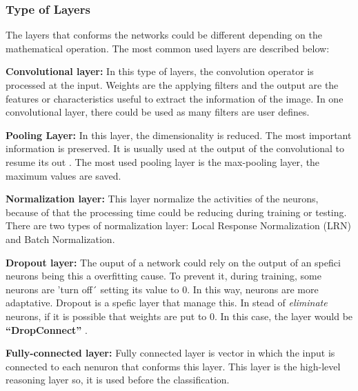 \subsubsection{Type of Layers}
The layers that conforms the networks could be different depending on the mathematical operation. The most common used layers are described below:
\begin{description}[noitemsep,topsep=8pt,parsep=0pt,partopsep=20pt]
	\item \textbf{Convolutional layer:} In this type of layers, the convolution operator is processed at the input. Weights are the applying filters and the output are the features or characteristics useful to extract the information of the image. In one convolutional layer, there could be used as many filters are user defines.
	\item \textbf{Pooling Layer:} In this layer, the dimensionality is reduced. The most important information is preserved. It is usually used at the output of the convolutional to resume its out \cite{Doorn}. The most used pooling layer is the max-pooling layer, the maximum values are saved.
	\item \textbf{Normalization layer:} This layer normalize the activities of the neurons, because of that the processing time could be reducing during training or testing. There are two types of normalization layer: Local Response Normalization (LRN) and Batch Normalization.
	\item \textbf{Dropout layer:} The ouput of a network could rely on the output of an spefici neurons being this a overfitting cause. To prevent it, during training, some neurons are 'turn off´ setting its value to 0. In this way, neurons are more adaptative. Dropout is a spefic layer that manage this. In stead of \textit{eliminate} neurons, if it is possible that weights are put to 0. In this case, the layer would be \textbf{``DropConnect''} \cite{Doorn}.
	\item  \textbf{Fully-connected layer:} Fully connected layer is vector in which the input is connected to each nenuron that conforms this layer. This layer is the high-level reasoning layer so, it is used before the classification.  
\end{description}


